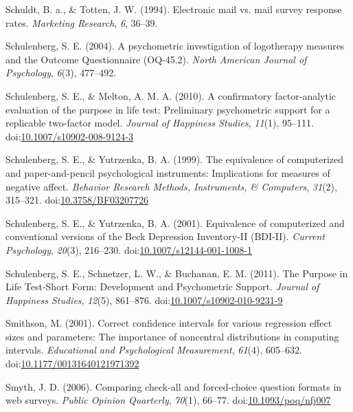 \documentclass[english,man, mask]{apa6}
\theoremstyle{definition}
\theoremstyle{definition}
\theoremstyle{definition}
\theoremstyle{remark}
\begin{document}
\hypertarget{ref-Schuldt1994}{}
Schuldt, B. a., \& Totten, J. W. (1994). Electronic mail vs. mail survey
response rates. \emph{Marketing Research}, \emph{6}, 36--39.

\hypertarget{ref-Schulenberg2004}{}
Schulenberg, S. E. (2004). A psychometric investigation of logotherapy
measures and the Outcome Questionnaire (OQ-45.2). \emph{North American
Journal of Psychology}, \emph{6}(3), 477--492.

\hypertarget{ref-Schulenberg2010}{}
Schulenberg, S. E., \& Melton, A. M. A. (2010). A confirmatory
factor-analytic evaluation of the purpose in life test: Preliminary
psychometric support for a replicable two-factor model. \emph{Journal of
Happiness Studies}, \emph{11}(1), 95--111.
doi:\href{https://doi.org/10.1007/s10902-008-9124-3}{10.1007/s10902-008-9124-3}

\hypertarget{ref-Schulenberg1999}{}
Schulenberg, S. E., \& Yutrzenka, B. A. (1999). The equivalence of
computerized and paper-and-pencil psychological instruments:
Implications for measures of negative affect. \emph{Behavior Research
Methods, Instruments, \& Computers}, \emph{31}(2), 315--321.
doi:\href{https://doi.org/10.3758/BF03207726}{10.3758/BF03207726}

\hypertarget{ref-Schulenberg2001}{}
Schulenberg, S. E., \& Yutrzenka, B. A. (2001). Equivalence of
computerized and conventional versions of the Beck Depression
Inventory-II (BDI-II). \emph{Current Psychology}, \emph{20}(3),
216--230.
doi:\href{https://doi.org/10.1007/s12144-001-1008-1}{10.1007/s12144-001-1008-1}

\hypertarget{ref-Schulenberg2011}{}
Schulenberg, S. E., Schnetzer, L. W., \& Buchanan, E. M. (2011). The
Purpose in Life Test-Short Form: Development and Psychometric Support.
\emph{Journal of Happiness Studies}, \emph{12}(5), 861--876.
doi:\href{https://doi.org/10.1007/s10902-010-9231-9}{10.1007/s10902-010-9231-9}

\hypertarget{ref-Smithson2001}{}
Smithson, M. (2001). Correct confidence intervals for various regression
effect sizes and parameters: The importance of noncentral distributions
in computing intervals. \emph{Educational and Psychological
Measurement}, \emph{61}(4), 605--632.
doi:\href{https://doi.org/10.1177/00131640121971392}{10.1177/00131640121971392}

\hypertarget{ref-Smyth2006}{}
Smyth, J. D. (2006). Comparing check-all and forced-choice question
formats in web surveys. \emph{Public Opinion Quarterly}, \emph{70}(1),
66--77.
doi:\href{https://doi.org/10.1093/poq/nfj007}{10.1093/poq/nfj007}
\end{document}
